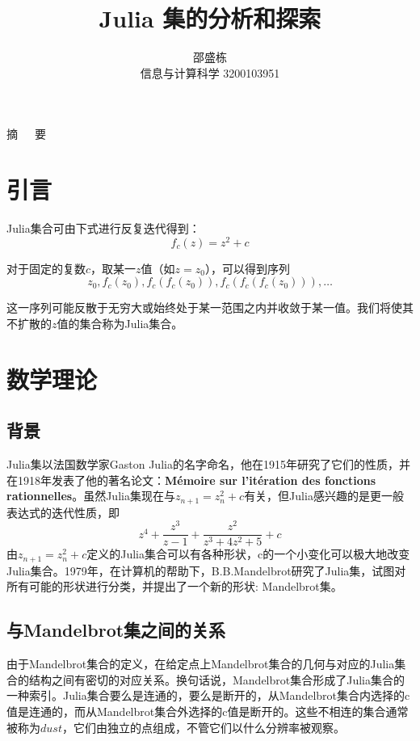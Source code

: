 \documentclass[UTF8,a4paper]{ctexart}
\title{\textbf{\huge{Julia 集的分析和探索}}}
\author{邵盛栋\\信息与计算科学 3200103951}
\date{}
\begin{document}
	\newcommand{\supercite}[1]{\textsuperscript{\cite{#1}}}
	\maketitle
	\setlength{\oddsidemargin}{ 1cm} 
	\setlength{\evensidemargin}{\oddsidemargin}
	\setlength{\textwidth}{13.50cm}
	\vspace{-0.2cm}

	\begin{center}  \parbox{\textwidth}{  {\heiti 摘~~~要}}  
	\end{center}
	
	\section{引言}
	Julia集合可由下式进行反复迭代得到：
	\[f_{c}(z)=z^{2}+c\]
	
	对于固定的复数$ c $，取某一$ z $值（如$ z=z_{0} $），可以得到序列
	\[z_{0},f_{c}(z_{0}),f_{c}(f_{c}(z_{0})),f_{c}(f_{c}(f_{c}(z_{0}))),\dots\]
	
	这一序列可能反散于无穷大或始终处于某一范围之内并收敛于某一值。我们将使其不扩散的$ z $值的集合称为Julia集合。
	\section{数学理论}
	\subsection{背景}
	Julia集以法国数学家Gaston Julia的名字命名，他在1915年研究了它们的性质，并在1918年发表了他的著名论文：\textbf{Mémoire sur l'itération des fonctions rationnelles}。虽然Julia集现在与$ z_{n+1}=z_{n}^{2}+c $有关，但Julia感兴趣的是更一般表达式的迭代性质，即
	\[z^{4}+\dfrac{z^{3}}{z-1}+\dfrac{z^{2}}{z^{3}+4z^{2}+5}+c\]
	由$ z_{n+1}=z_{n}^{2}+c $定义的Julia集合可以有各种形状，c的一个小变化可以极大地改变Julia集合。1979年，在计算机的帮助下，B.B.Mandelbrot研究了Julia集，试图对所有可能的形状进行分类，并提出了一个新的形状: Mandelbrot集\cite{douady1986julia}。
	\subsection{与Mandelbrot集之间的关系}
	由于Mandelbrot集合的定义，在给定点上Mandelbrot集合的几何与对应的Julia集合的结构之间有密切的对应关系。换句话说，Mandelbrot集合形成了Julia集合的一种索引。\cite{lei1990similarity}Julia集合要么是连通的，要么是断开的，从Mandelbrot集合内选择的c值是连通的，而从Mandelbrot集合外选择的c值是断开的。这些不相连的集合通常被称为$ dust $，它们由独立的点组成，不管它们以什么分辨率被观察\cite{Juliaset}。
\end{document}
